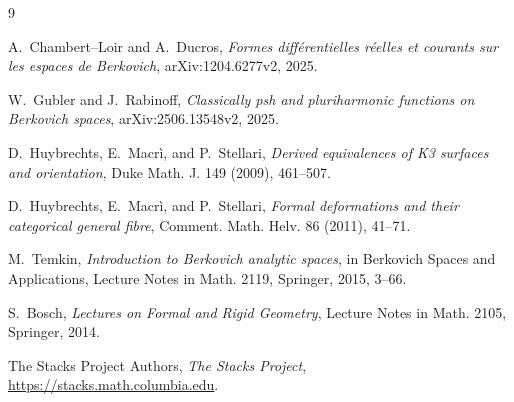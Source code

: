 \documentclass[11pt]{article}
\begin{document}



\begin{thebibliography}{9}

A.~Chambert--Loir and A.~Ducros,
\emph{Formes diff\'erentielles r\'eelles et courants sur les espaces de
Berkovich}, arXiv:1204.6277v2, 2025.

W.~Gubler and J.~Rabinoff,
\emph{Classically psh and pluriharmonic functions on Berkovich spaces},
arXiv:2506.13548v2, 2025.

D.~Huybrechts, E.~Macr\`i, and P.~Stellari,
\emph{Derived equivalences of K3 surfaces and orientation},
Duke Math. J. 149 (2009), 461--507.

D.~Huybrechts, E.~Macr\`i, and P.~Stellari,
\emph{Formal deformations and their categorical general fibre},
Comment. Math. Helv. 86 (2011), 41--71.

M.~Temkin,
\emph{Introduction to Berkovich analytic spaces},
in Berkovich Spaces and Applications, Lecture Notes in Math. 2119,
Springer, 2015, 3--66.

S.~Bosch,
\emph{Lectures on Formal and Rigid Geometry},
Lecture Notes in Math. 2105, Springer, 2014.

The Stacks Project Authors, \emph{The Stacks Project},
\url{https://stacks.math.columbia.edu}.

\end{thebibliography}
\end{document}
